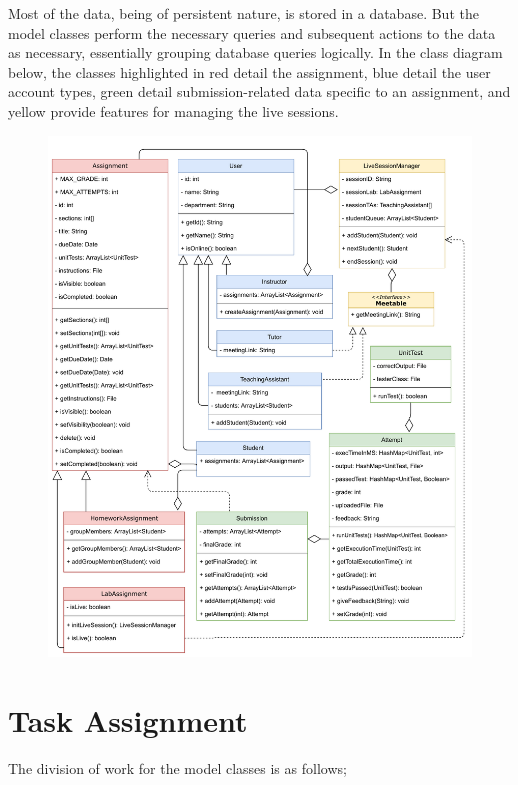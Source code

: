 \documentclass[a4paper, 12pt]{article}
\begin{document}
    Most of the data, being of persistent nature, is stored in a database. But the model classes
    perform the necessary queries and subsequent actions to the data as necessary,
    essentially grouping database queries logically.
    In the class diagram below, the classes highlighted in red detail the assignment, blue detail the user account types,
    green detail submission-related data specific to an assignment, and yellow provide features
    for managing the live sessions.

    \begin{figure}[H]
        \centering
        \includegraphics[width=\textwidth]{class-diagram}
    \end{figure}

    
    \section{Task Assignment}
    
    The division of work for the model classes is as follows;
    
\end{document}
